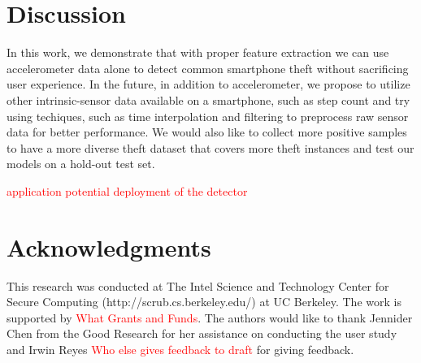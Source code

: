 \documentclass{soups}
\begin{document}
\section{Discussion}
In this work, we demonstrate that with proper feature extraction we can use accelerometer data alone to detect common smartphone theft without sacrificing user experience. In the future, in addition to accelerometer, we propose to utilize other intrinsic-sensor data available on a smartphone, such as step count and try using techiques, such as time interpolation and filtering to preprocess raw sensor data for better performance. We would also like to collect more positive samples to have a more diverse theft dataset that covers more theft instances and test our models on a hold-out test set. 

\textcolor{red}{application potential deployment of the detector}



\section{Acknowledgments}
This research was conducted at The Intel Science and Technology Center for Secure Computing (http://scrub.cs.berkeley.edu/) at UC Berkeley. The work is supported by \textcolor{red}{What Grants and Funds}. The authors would like to thank Jennider Chen from the Good Research for her assistance on conducting the user study and Irwin Reyes \textcolor{red}{Who else gives feedback to draft} for giving feedback.




%
\end{document}

